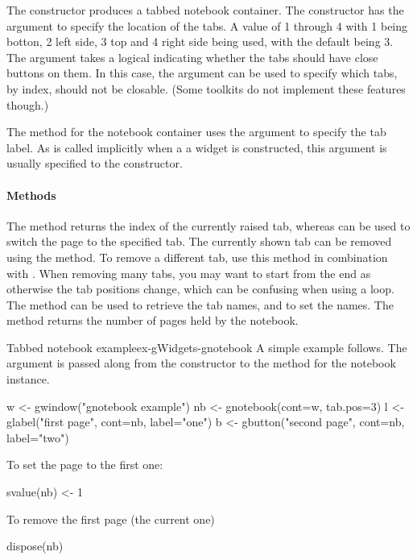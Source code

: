 The  constructor produces a tabbed notebook
container. The constructor has the argument 
to specify the location of the tabs. A value of 1 through 4 with 1
being botton, 2 left side, 3 top and 4 right side being used, with the
default being 3. The  argument takes a logical
indicating whether the tabs should have close buttons on them. In this
case, the argument  can be used to
specify which tabs, by index, should not be closable. (Some toolkits do
not implement these features though.)

The  method for the notebook container uses the
 argument to specify the tab label. As 
is called implicitly when a a widget is constructed, this argument is usually
specified to the constructor.

\paragraph{Methods}
The  method returns the index of the
currently raised tab, whereas  can be
used to switch the page to the specified tab. The currently shown tab can be
removed using the  method. To remove a
different tab, use this method in combination with
. When removing many tabs, you may want to start
from the end as otherwise the tab positions change, which can be
confusing when using a loop. The  method can
be used to retrieve the tab names, and
 to set the names. The
 method returns the number of pages held by
the notebook.


\begin{example}{Tabbed notebook example}{ex-gWidgets-gnotebook}
  A simple example follows. The  argument is passed along from the constructor
  to the  method for the notebook instance.
\begin{Schunk}
\begin{Sinput}
 w <- gwindow("gnotebook example")
 nb <- gnotebook(cont=w, tab.pos=3)
 l <- glabel("first page", cont=nb, label="one")
 b <- gbutton("second page", cont=nb, label="two")
\end{Sinput}
\end{Schunk}
To set the page to the first one:
\begin{Schunk}
\begin{Sinput}
 svalue(nb) <- 1
\end{Sinput}
\end{Schunk}
To remove the first page (the current one)
\begin{Schunk}
\begin{Sinput}
 dispose(nb)
\end{Sinput}
\end{Schunk}
\end{example}

